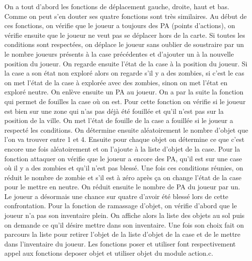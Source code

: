 \documentclass[a4paper,11pt]{article}
\begin{document}
On a tout d’abord les fonctions de déplacement gauche, droite, haut et bas. Comme on peut s’en douter ses quatre fonctions sont très similaires. Au début de ces fonctions, on vérifie que le joueur a toujours des PA (points d’actions), on vérifie ensuite que le joueur ne veut pas se déplacer hors de la carte. Si toutes les conditions sont respectées, on déplace le joueur sans oublier de soustraire par un le nombre joueurs présents à la case précédentes et d’ajouter un à la nouvelle position du joueur. On regarde ensuite l’état de la case à la position du joueur. Si la case a son état non exploré alors on regarde s’il y a des zombies, si c’est le cas on met l’état de la case à explorée avec des zombies, sinon on met l’état en exploré neutre. On enlève ensuite un PA au joueur.
On a par la suite la fonction qui permet de fouilles la case où on est. Pour cette fonction on vérifie si le joueur est bien sur une zone qui n’as pas déjà été fouillée et qu’il n’est pas sur la position de la ville. On met l’état de fouille de la case a fouillée si le joueur a respecté les conditions. On détermine ensuite aléatoirement le nombre d’objet que l’on va trouver entre 1 et 4. Ensuite pour chaque objet on détermine ce que c’est encore une fois aléatoirement et on l’ajoute à la liste d’objet de la case.
Pour la fonction attaquer on vérifie que le joueur a encore des PA, qu’il est sur une case où il y a des zombies et qu’il n’est pas blessé. Une fois ces conditions réunies, on réduit le nombre de zombie et s’il est à zéro après ça on change l’état de la case pour le mettre en neutre. On réduit ensuite le nombre de PA du joueur par un. Le joueur a désormais une chance sur quatre d’avoir été blessé lors de cette confrontation.
Pour la fonction de ramassage d’objet, on vérifie d’abord que le joueur n’a pas son inventaire plein. On affiche alors la liste des objets au sol puis on demande ce qu’il désire mettre dans son inventaire. Une fois son choix fait on parcours la liste pour retirer l’objet de la liste d’objet de la case et de le mettre dans l’inventaire du joueur.
Les fonctions poser et utiliser font respectivement appel aux fonctions deposer objet et utiliser objet du module action.c.
\\
\end{document}
